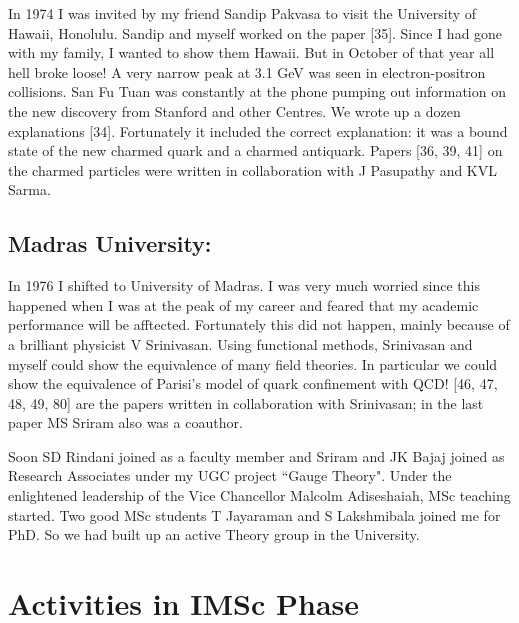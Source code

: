 In 1974 I was invited by my friend Sandip Pakvasa to visit the 
University of Hawaii, Honolulu. Sandip and myself worked on the paper 
[35]. Since I had gone with my family, I wanted to show them Hawaii. But 
in October of that year all hell broke loose! A very narrow peak at 3.1 
GeV was seen in electron-positron collisions. San Fu Tuan was constantly 
at the phone pumping out information on the new discovery from Stanford 
and other Centres. We wrote up a dozen explanations [34]. Fortunately it 
included the correct explanation: it was a bound state of the new 
charmed quark and a charmed antiquark. Papers [36, 39, 41] on the charmed 
particles were written in collaboration with J Pasupathy and KVL Sarma.


\vspace{-.3cm}

\subsection*{Madras University:}

In 1976 I shifted to University of Madras. I was very much worried since 
this happened when I was at the peak of my caree\-r and feared that my 
academic performance will be afftected. Fortunately this did not happen, 
mainly because of a brilliant physicist V Srinivasan. Using functional 
methods, Srinivasan and myself could show the equivalence of many field 
theories. In parti\-cular we could show the equivalence of Parisi's model 
of quark confinement with QCD! [46, 47, 48, 49, 80] are the papers written 
in collaboration with Srinivasan; in the last paper MS Sriram also was a 
coauthor.

Soon SD Rindani joined as a faculty member and Sriram and JK Bajaj 
joined as Research Associates under my UGC project ``Ga\-uge Theory". Under 
the enlightened leadership of the Vice Chancellor Malcolm Adiseshaiah, 
MSc teaching started. Two good MSc students T Jayaraman and S 
Lakshmibala joined me for PhD. So we had built up an active Theory group 
in the University.

\vspace{-\topsep}
\section*{Activities in IMSc Phase}

